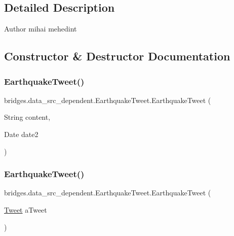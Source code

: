 \subsection{Detailed Description}
\begin{DoxyAuthor}{Author}
mihai mehedint 
\end{DoxyAuthor}


\subsection{Constructor \& Destructor Documentation}
\hypertarget{classbridges_1_1data__src__dependent_1_1_earthquake_tweet_a1f2d4634e85c75c59ba9d4aec878db54}{}\label{classbridges_1_1data__src__dependent_1_1_earthquake_tweet_a1f2d4634e85c75c59ba9d4aec878db54} 
\subsubsection{\texorpdfstring{Earthquake\+Tweet()}{EarthquakeTweet()}\hspace{0.1cm}{\footnotesize\ttfamily [1/2]}}
{\footnotesize\ttfamily bridges.\+data\+\_\+src\+\_\+dependent.\+Earthquake\+Tweet.\+Earthquake\+Tweet (\begin{DoxyParamCaption}\item[{String}]{content,  }\item[{Date}]{date2 }\end{DoxyParamCaption})}

\hypertarget{classbridges_1_1data__src__dependent_1_1_earthquake_tweet_af0a8e9201997a7d4805f11c02f197410}{}\label{classbridges_1_1data__src__dependent_1_1_earthquake_tweet_af0a8e9201997a7d4805f11c02f197410} 
\subsubsection{\texorpdfstring{Earthquake\+Tweet()}{EarthquakeTweet()}\hspace{0.1cm}{\footnotesize\ttfamily [2/2]}}
{\footnotesize\ttfamily bridges.\+data\+\_\+src\+\_\+dependent.\+Earthquake\+Tweet.\+Earthquake\+Tweet (\begin{DoxyParamCaption}\item[{\hyperlink{classbridges_1_1data__src__dependent_1_1_tweet}{Tweet}}]{a\+Tweet }\end{DoxyParamCaption})}



